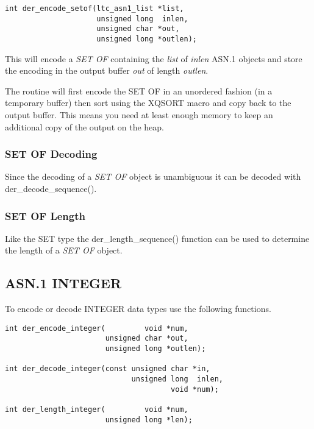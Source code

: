 \documentclass[synpaper]{book}
\begin{document}
\begin{verbatim}
int der_encode_setof(ltc_asn1_list *list, 
                     unsigned long  inlen,
                     unsigned char *out,  
                     unsigned long *outlen);
\end{verbatim}

This will encode a \textit{SET OF} containing the \textit{list} of \textit{inlen} ASN.1 objects and store the encoding in the output buffer \textit{out} of length \textit{outlen}.

The routine will first encode the SET OF in an unordered fashion (in a temporary buffer) then sort using the XQSORT macro and copy back to the output buffer.  This
means you need at least enough memory to keep an additional copy of the output on the heap.  

\subsubsection{SET OF Decoding}
Since the decoding of a \textit{SET OF} object is unambiguous it can be decoded with der\_decode\_sequence().  

\subsubsection{SET OF Length}
Like the SET type the der\_length\_sequence() function can be used to determine the length of a \textit{SET OF} object.

\subsection{ASN.1 INTEGER}

To encode or decode INTEGER data types use the following functions.

\begin{verbatim}
int der_encode_integer(         void *num, 
                       unsigned char *out, 
                       unsigned long *outlen);

int der_decode_integer(const unsigned char *in, 
                             unsigned long  inlen, 
                                      void *num);

int der_length_integer(         void *num, 
                       unsigned long *len);
\end{verbatim}
\end{document}
